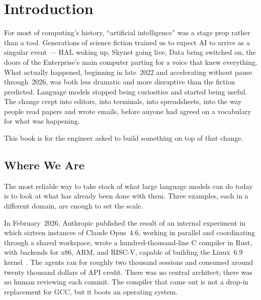 
\chapter{Introduction}
\label{ch:intro}

For most of computing's history, ``artificial intelligence'' was a
stage prop rather than a tool. Generations of science fiction
trained us to expect AI to arrive as a singular event --- HAL
waking up, Skynet going live, Data being switched on, the doors of
the Enterprise's main computer parting for a voice that knew
everything. What actually happened, beginning in late~2022 and
accelerating without pause through~2026, was both less dramatic and
more disruptive than the fiction predicted. Language models stopped
being curiosities and started being useful. The change crept into
editors, into terminals, into spreadsheets, into the way people
read papers and wrote emails, before anyone had agreed on a
vocabulary for what was happening.

\noindent
This book is for the engineer asked to build something on top of
that change.

\section{Where We Are}
\label{sec:intro-now}

The most reliable way to take stock of what large language models
can do today is to look at what has already been done with them.
Three examples, each in a different domain, are enough to set the
scale.

In February~2026, Anthropic published the result of an internal
experiment in which sixteen instances of Claude Opus~4.6, working
in parallel and coordinating through a shared workspace, wrote a
hundred-thousand-line C compiler in Rust, with backends for x86,
ARM, and RISC-V, capable of building the Linux~6.9
kernel~\citep{anthropic2026compiler}. The agents ran for roughly
two thousand sessions and consumed around twenty thousand dollars
of API credit. There was no central architect; there was no human
reviewing each commit. The compiler that came out is not a drop-in
replacement for GCC, but it boots an operating system.

